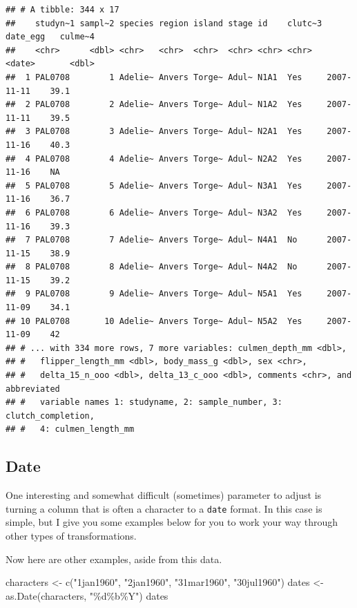 \documentclass[
]{book}
\newenvironment{Shaded}{\begin{snugshade}}{\end{snugshade}}
\newcommand{\FunctionTok}[1]{\textcolor[rgb]{0.00,0.00,0.00}{#1}}
\newcommand{\NormalTok}[1]{#1}
\newcommand{\OtherTok}[1]{\textcolor[rgb]{0.56,0.35,0.01}{#1}}
\newcommand{\SpecialCharTok}[1]{\textcolor[rgb]{0.00,0.00,0.00}{#1}}
\newcommand{\StringTok}[1]{\textcolor[rgb]{0.31,0.60,0.02}{#1}}
\begin{document}
\begin{verbatim}
## # A tibble: 344 x 17
##    studyn~1 sampl~2 species region island stage id    clutc~3 date_egg   culme~4
##    <chr>      <dbl> <chr>   <chr>  <chr>  <chr> <chr> <chr>   <date>       <dbl>
##  1 PAL0708        1 Adelie~ Anvers Torge~ Adul~ N1A1  Yes     2007-11-11    39.1
##  2 PAL0708        2 Adelie~ Anvers Torge~ Adul~ N1A2  Yes     2007-11-11    39.5
##  3 PAL0708        3 Adelie~ Anvers Torge~ Adul~ N2A1  Yes     2007-11-16    40.3
##  4 PAL0708        4 Adelie~ Anvers Torge~ Adul~ N2A2  Yes     2007-11-16    NA  
##  5 PAL0708        5 Adelie~ Anvers Torge~ Adul~ N3A1  Yes     2007-11-16    36.7
##  6 PAL0708        6 Adelie~ Anvers Torge~ Adul~ N3A2  Yes     2007-11-16    39.3
##  7 PAL0708        7 Adelie~ Anvers Torge~ Adul~ N4A1  No      2007-11-15    38.9
##  8 PAL0708        8 Adelie~ Anvers Torge~ Adul~ N4A2  No      2007-11-15    39.2
##  9 PAL0708        9 Adelie~ Anvers Torge~ Adul~ N5A1  Yes     2007-11-09    34.1
## 10 PAL0708       10 Adelie~ Anvers Torge~ Adul~ N5A2  Yes     2007-11-09    42  
## # ... with 334 more rows, 7 more variables: culmen_depth_mm <dbl>,
## #   flipper_length_mm <dbl>, body_mass_g <dbl>, sex <chr>,
## #   delta_15_n_ooo <dbl>, delta_13_c_ooo <dbl>, comments <chr>, and abbreviated
## #   variable names 1: studyname, 2: sample_number, 3: clutch_completion,
## #   4: culmen_length_mm
\end{verbatim}

\hypertarget{date}{%
\subsection{Date}\label{date}}

One interesting and somewhat difficult (sometimes) parameter to adjust is turning a column that is often a character to a \texttt{date} format.
In this case is simple, but I give you some examples below for you to work your way through other types of transformations.

\begin{Shaded}
\end{Shaded}

Now here are other examples, aside from this data.

\begin{Shaded}
\begin{Highlighting}[]
\NormalTok{characters }\OtherTok{\textless{}{-}} \FunctionTok{c}\NormalTok{(}\StringTok{"1jan1960"}\NormalTok{, }\StringTok{"2jan1960"}\NormalTok{, }\StringTok{"31mar1960"}\NormalTok{, }\StringTok{"30jul1960"}\NormalTok{)}
\NormalTok{dates }\OtherTok{\textless{}{-}} \FunctionTok{as.Date}\NormalTok{(characters, }\StringTok{"\%d\%b\%Y"}\NormalTok{)}
\NormalTok{dates}
\end{Highlighting}
\end{Shaded}
\end{document}
